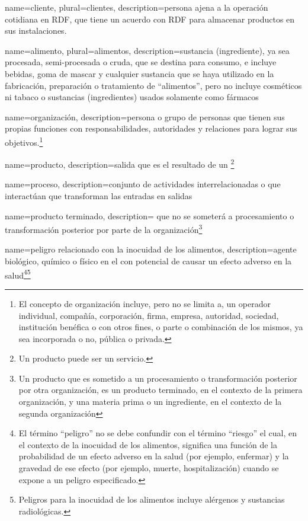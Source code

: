 {
    name=cliente,
    plural=clientes,
    description={persona ajena a la operación cotidiana en RDF, que tiene un acuerdo con RDF para almacenar productos en sus instalaciones.}
}

{
    name=alimento,
    plural=alimentos,
    description={sustancia (ingrediente), ya sea procesada, semi-procesada o cruda, que se destina para consumo, e incluye bebidas, goma de mascar y cualquier sustancia que se haya utilizado en la fabricación, preparación o tratamiento de “alimentos”, pero no incluye cosméticos ni tabaco o sustancias (ingredientes) usados solamente como fármacos}
}

{
    name=organización,
    description={persona o grupo de personas que tienen sus propias funciones con responsabilidades, autoridades y relaciones para lograr sus objetivos.\footnote{El concepto de organización incluye, pero no se limita a, un operador individual, compañía, corporación, firma, empresa, autoridad, sociedad, institución benéfica o con otros fines, o parte o combinación de los mismos, ya sea incorporada o no, pública o privada.}}
}

{
    name=producto,
    description={salida que es el resultado de un \footnote{Un producto puede ser un servicio.}}
}

{
    name=proceso,
    description={conjunto de actividades interrelacionadas o que interactúan que transforman las entradas en salidas}
}

{
    name=producto terminado,
    description={ que no se someterá a procesamiento o transformación posterior por parte de la organización\footnote{Un producto que es sometido a un procesamiento o transformación posterior por otra organización, es un producto terminado, en el contexto de la primera organización, y una materia prima o un ingrediente, en el contexto de la segunda organización}}
}

{
    name=peligro relacionado con la inocuidad de los alimentos,
    description={agente biológico, químico o físico en el  con potencial de causar un efecto adverso en la salud\footnote{El término “peligro” no se debe confundir con el término “riesgo” el cual, en el contexto de la inocuidad de los alimentos, significa una función de la probabilidad de un efecto adverso en la salud (por ejemplo, enfermar) y la gravedad de ese efecto (por ejemplo, muerte, hospitalización) cuando se expone a un peligro especificado.}\footnote{Peligros para la inocuidad de los alimentos incluye alérgenos y sustancias radiológicas.}}
}

